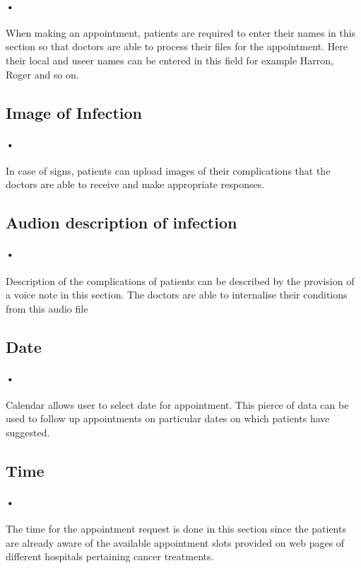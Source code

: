 \documentclass[12pt]{article}
\begin{document}
\paragraph{•} When making an appointment, patients are required to enter their names in this section so that doctors are able to process their files for the appointment. Here their local and useer names can be entered in this field for example Harron, Roger and so on.

\subsection{Image of Infection}
\paragraph{•} In case of signs, patients can upload images of their complications that the doctors are able to receive and make appropriate responses.

\subsection{Audion description of infection}
\paragraph{•}  Description of the complications of patients can be described by the provision of a voice note in this section. The doctors are able to internalise their conditions from this audio file 

\subsection{Date}
\paragraph{•}Calendar allows user to select date for appointment. This pierce of data can be used to follow up appointments on  particular dates on which patients have suggested.

\subsection{Time}
\paragraph{•} The time for the appointment request is done in this section since the patients are already aware of the available appointment slots provided on web pages of different hospitals pertaining cancer treatments.
\end{document}
